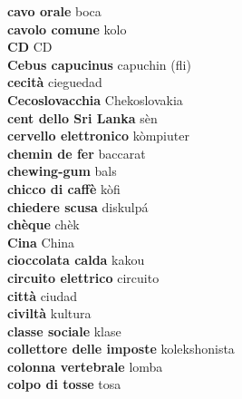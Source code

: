\textbf{ cavo orale  } boca \\
\textbf{ cavolo comune  } kolo \\
\textbf{ CD  } CD \\
\textbf{ Cebus capucinus  } capuchin (fli) \\
\textbf{ cecità  } cieguedad \\
\textbf{ Cecoslovacchia  } Chekoslovakia \\
\textbf{ cent dello Sri Lanka  } sèn \\
\textbf{ cervello elettronico  } kòmpiuter \\
\textbf{ chemin de fer  } baccarat \\
\textbf{ chewing-gum  } bals \\
\textbf{ chicco di caffè  } kòfi \\
\textbf{ chiedere scusa  } diskulpá \\
\textbf{ chèque  } chèk \\
\textbf{ Cina  } China \\
\textbf{ cioccolata calda  } kakou \\
\textbf{ circuito elettrico  } circuito \\
\textbf{ città  } ciudad \\
\textbf{ civiltà  } kultura \\
\textbf{ classe sociale  } klase \\
\textbf{ collettore delle imposte  } kolekshonista \\
\textbf{ colonna vertebrale  } lomba \\
\textbf{ colpo di tosse  } tosa \\
